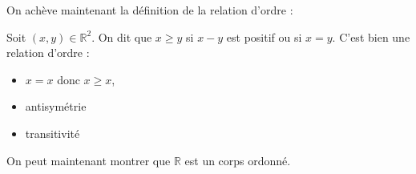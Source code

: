 On achève maintenant la définition de la relation d'ordre :
\begin{defini}
    Soit $(x,y)\in \mathbb{R}^2$. On dit que $x\geq y$ si $x-y$ est positif ou si $x=y$.
    \tcblower
    C'est bien une relation d'ordre :
    \begin{itemize}
        \item $x=x$ donc $x\geq x$,
        \item antisymétrie
        \item transitivité 
    \end{itemize}
\end{defini}

On peut maintenant montrer que $\mathbb{R}$ est un corps ordonné.